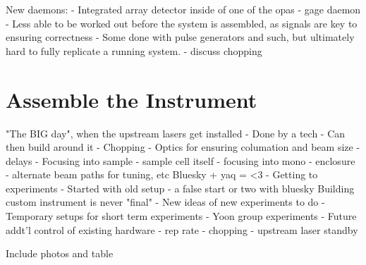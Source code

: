    New daemons:
   - Integrated array detector inside of one of the opas
   - gage daemon
      - Less able to be worked out before the system is assembled, as signals are key to ensuring correctness
      - Some done with pulse generators and such, but ultimately hard to fully replicate a running system.
      - discuss chopping

\clearpage

\section{Assemble the Instrument}  %

"The BIG day", when the upstream lasers get installed
   - Done by a tech
   - Can then build around it
      - Chopping
      - Optics for ensuring columation and beam size
      - delays
      - Focusing into sample
      - sample cell itself
      - focusing into mono
      - enclosure
      - alternate beam paths for tuning, etc
Bluesky + yaq = <3
   - Getting to experiments
   - Started with old setup
   - a false start or two with bluesky
Building custom instrument is never "final"
  - New ideas of new experiments to do
  - Temporary setups for short term experiments
     - Yoon group experiments
  - Future addt'l control of existing hardware
     - rep rate
     - chopping
     - upstream laser standby

Include photos and table

\clearpage
